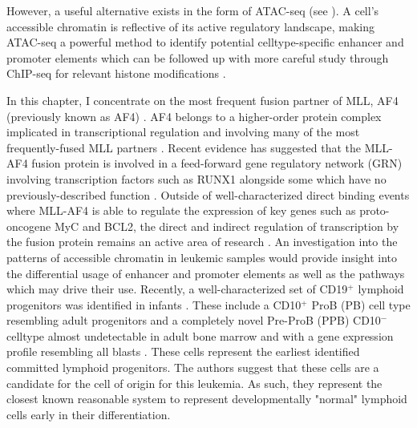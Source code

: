 However, a useful alternative exists in the form of ATAC-seq (see ).
A cell's accessible chromatin is reflective of its active regulatory landscape, making ATAC-seq a powerful method to identify potential celltype-specific enhancer and promoter elements which can be followed up with more careful study through ChIP-seq for relevant histone modifications \cite{Thurman2012,Zhang2021,Schulz2019}. 




In this chapter, I concentrate on the most frequent fusion partner of MLL, AF4 (previously known as AF4) \cite{Meyer2017}. AF4 belongs to a higher-order protein complex implicated in transcriptional regulation and involving many of the most frequently-fused MLL partners \cite{Yokoyama2010}. 
Recent evidence has suggested that the MLL-AF4 fusion protein is involved in a feed-forward gene regulatory network (GRN) involving transcription factors such as RUNX1 alongside some which have no previously-described function \cite{Harman2021, Wilkinson2013}. 
Outside of well-characterized direct binding events where MLL-AF4 is able to regulate the expression of key genes such as proto-oncogene MyC and BCL2, the direct and indirect regulation of transcription by the fusion protein remains an active area of research \cite{Harman2021}. 
An investigation into the patterns of accessible chromatin in leukemic samples would provide insight into the differential usage of enhancer and promoter elements as well as the pathways which may drive their use. 
Recently, a well-characterized set of CD19$^+$ lymphoid progenitors was identified in infants \cite{OByrne2019}. 
These include a CD10$^+$ ProB (PB) cell type resembling adult progenitors and a completely novel Pre-ProB (PPB) CD10$^-$ celltype almost undetectable in adult bone marrow and with a gene expression profile resembling \gls{all} blasts \cite{OByrne2019}. 
These cells represent the earliest identified committed lymphoid progenitors. The authors suggest that these cells are a candidate for the cell of origin for this leukemia.
As such, they represent the closest known reasonable system to represent developmentally "normal" lymphoid cells early in their differentiation.

